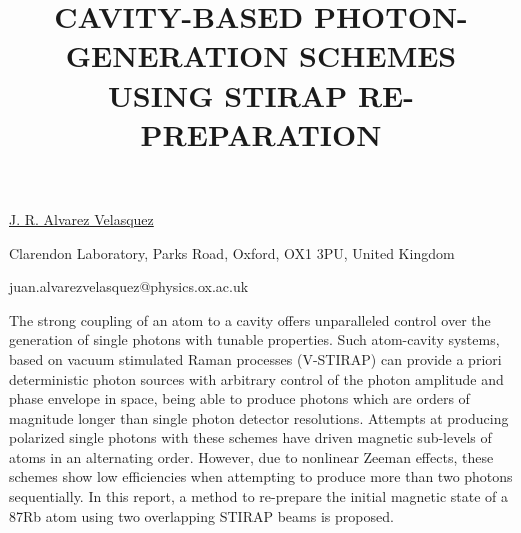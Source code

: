\title{CAVITY-BASED PHOTON-GENERATION SCHEMES USING STIRAP RE-PREPARATION}

\underline{J. R. Alvarez Velasquez}  

{\normalsize{\vspace{-4mm}
Clarendon Laboratory, Parks Road, Oxford, OX1 3PU, United Kingdom


\email juan.alvarezvelasquez@physics.ox.ac.uk}}

The strong coupling of an atom to a cavity offers unparalleled control over the generation of single photons with tunable properties. Such atom-cavity systems, based on vacuum stimulated Raman processes (V-STIRAP) can provide a priori deterministic photon sources with arbitrary control of the photon amplitude and phase envelope in space, being able to produce photons which are orders of magnitude longer than single photon detector resolutions.
Attempts at producing polarized single photons with these schemes have driven magnetic sub-levels of atoms in an alternating order. However, due to nonlinear Zeeman effects, these schemes show low efficiencies when attempting to produce more than two photons sequentially. In this report, a method to re-prepare the initial magnetic state of a 87Rb atom using two overlapping STIRAP beams is proposed.

\vspace{\baselineskip}

